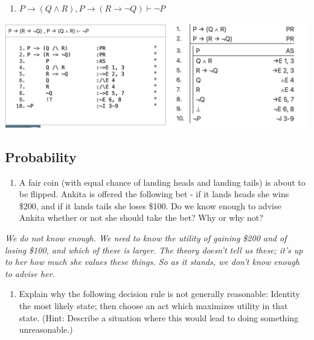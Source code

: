 \documentclass[
  11pt,
]{article}
\providecommand{\tightlist}{%
  \setlength{\itemsep}{0pt}\setlength{\parskip}{0pt}}
\begin{document}
\newpage

\begin{enumerate}
\def\labelenumi{\arabic{enumi}.}
\setcounter{enumi}{11}
\tightlist
\item
  \(P \rightarrow (Q \wedge R), P \rightarrow (R \rightarrow \neg Q) \vdash \neg P\)
\end{enumerate}

\includegraphics{q12.png}

\hypertarget{probability}{%
\subsection{Probability}\label{probability}}

\begin{enumerate}
\def\labelenumi{\arabic{enumi}.}
\setcounter{enumi}{12}
\tightlist
\item
  A fair coin (with equal chance of landing heads and landing tails) is
  about to be flipped. Ankita is offered the following bet - if it lands
  heads she wins \$200, and if it lands tails she loses \$100. Do we
  know enough to advise Ankita whether or not she should take the bet?
  Why or why not?
\end{enumerate}

\emph{We do not know enough. We need to know the utility of gaining
\$200 and of losing \$100, and which of these is larger. The theory
doesn't tell us these; it's up to her how much she values these things.
So as it stands, we don't know enough to advise her}.

\begin{enumerate}
\def\labelenumi{\arabic{enumi}.}
\setcounter{enumi}{13}
\tightlist
\item
  Explain why the following decision rule is not generally reasonable:
  Identity the most likely state; then choose an act which maximizes
  utility in that state. (Hint: Describe a situation where this would
  lead to doing something unreasonable.)
\end{enumerate}
\end{document}
